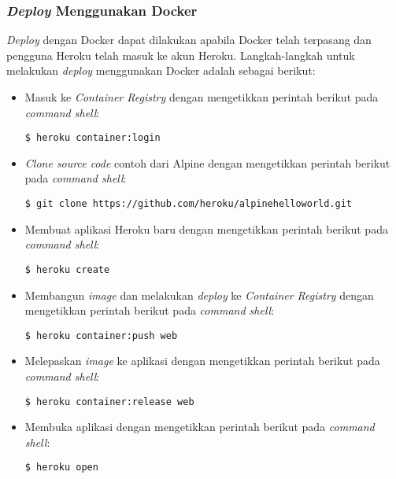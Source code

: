 \subsubsection{\textit{Deploy} Menggunakan Docker}
\textit{Deploy} dengan Docker dapat dilakukan apabila Docker telah terpasang dan pengguna Heroku telah masuk ke akun Heroku. Langkah-langkah untuk melakukan \textit{deploy} menggunakan Docker adalah sebagai berikut:
\begin{itemize}
\item Masuk ke \textit{Container Registry} dengan mengetikkan perintah berikut pada \textit{command shell}:
\begin{lstlisting}
$ heroku container:login
\end{lstlisting}

\item \textit{Clone source code} contoh dari Alpine dengan mengetikkan perintah berikut pada \textit{command shell}:
\begin{lstlisting}
$ git clone https://github.com/heroku/alpinehelloworld.git
\end{lstlisting}

\item Membuat aplikasi Heroku baru dengan mengetikkan perintah berikut pada \textit{command shell}:
\begin{lstlisting}
$ heroku create
\end{lstlisting}

\item Membangun \textit{image} dan melakukan \textit{deploy} ke \textit{Container Registry} dengan mengetikkan perintah berikut pada \textit{command shell}:
\begin{lstlisting}
$ heroku container:push web
\end{lstlisting}

\item Melepaskan \textit{image} ke aplikasi dengan mengetikkan perintah berikut pada \textit{command shell}:
\begin{lstlisting}
$ heroku container:release web
\end{lstlisting}

\item Membuka aplikasi dengan mengetikkan perintah berikut pada \textit{command shell}:
\begin{lstlisting}
$ heroku open
\end{lstlisting}
\end{itemize}

